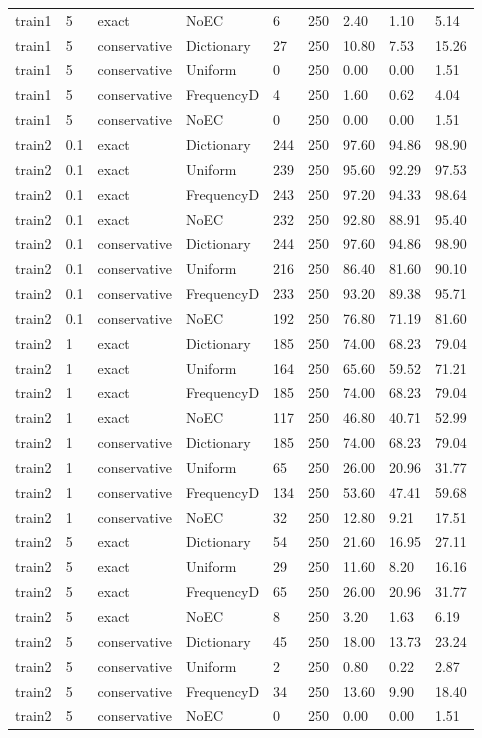 \begin{table}[htbp]
{\begin{tabular}{lllllllll}
train1 & 5 & exact & NoEC & 6 & 250 & 2.40 & 1.10 & 5.14 \\
train1 & 5 & conservative & Dictionary & 27 & 250 & 10.80 & 7.53 & 15.26 \\
train1 & 5 & conservative & Uniform & 0 & 250 & 0.00 & 0.00 & 1.51 \\
train1 & 5 & conservative & FrequencyD & 4 & 250 & 1.60 & 0.62 & 4.04 \\
train1 & 5 & conservative & NoEC & 0 & 250 & 0.00 & 0.00 & 1.51 \\
train2 & 0.1 & exact & Dictionary & 244 & 250 & 97.60 & 94.86 & 98.90 \\
train2 & 0.1 & exact & Uniform & 239 & 250 & 95.60 & 92.29 & 97.53 \\
train2 & 0.1 & exact & FrequencyD & 243 & 250 & 97.20 & 94.33 & 98.64 \\
train2 & 0.1 & exact & NoEC & 232 & 250 & 92.80 & 88.91 & 95.40 \\
train2 & 0.1 & conservative & Dictionary & 244 & 250 & 97.60 & 94.86 & 98.90 \\
train2 & 0.1 & conservative & Uniform & 216 & 250 & 86.40 & 81.60 & 90.10 \\
train2 & 0.1 & conservative & FrequencyD & 233 & 250 & 93.20 & 89.38 & 95.71 \\
train2 & 0.1 & conservative & NoEC & 192 & 250 & 76.80 & 71.19 & 81.60 \\
train2 & 1 & exact & Dictionary & 185 & 250 & 74.00 & 68.23 & 79.04 \\
train2 & 1 & exact & Uniform & 164 & 250 & 65.60 & 59.52 & 71.21 \\
train2 & 1 & exact & FrequencyD & 185 & 250 & 74.00 & 68.23 & 79.04 \\
train2 & 1 & exact & NoEC & 117 & 250 & 46.80 & 40.71 & 52.99 \\
train2 & 1 & conservative & Dictionary & 185 & 250 & 74.00 & 68.23 & 79.04 \\
train2 & 1 & conservative & Uniform & 65 & 250 & 26.00 & 20.96 & 31.77 \\
train2 & 1 & conservative & FrequencyD & 134 & 250 & 53.60 & 47.41 & 59.68 \\
train2 & 1 & conservative & NoEC & 32 & 250 & 12.80 & 9.21 & 17.51 \\
train2 & 5 & exact & Dictionary & 54 & 250 & 21.60 & 16.95 & 27.11 \\
train2 & 5 & exact & Uniform & 29 & 250 & 11.60 & 8.20 & 16.16 \\
train2 & 5 & exact & FrequencyD & 65 & 250 & 26.00 & 20.96 & 31.77 \\
train2 & 5 & exact & NoEC & 8 & 250 & 3.20 & 1.63 & 6.19 \\
train2 & 5 & conservative & Dictionary & 45 & 250 & 18.00 & 13.73 & 23.24 \\
train2 & 5 & conservative & Uniform & 2 & 250 & 0.80 & 0.22 & 2.87 \\
train2 & 5 & conservative & FrequencyD & 34 & 250 & 13.60 & 9.90 & 18.40 \\
train2 & 5 & conservative & NoEC & 0 & 250 & 0.00 & 0.00 & 1.51 \\
\hline
\end{tabular}}
\end{table}
